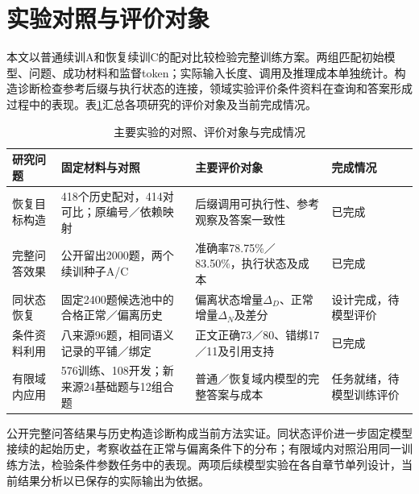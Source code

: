 \section{实验对照与评价对象}

本文以普通续训A和恢复续训C的配对比较检验完整训练方案。两组匹配初始模型、问题、成功材料和监督token；实际输入长度、调用及推理成本单独统计。构造诊断检查参考后缀与执行状态的连接，领域实验评价条件资料在查询和答案形成过程中的表现。表\ref{tab:experiment-matrix}汇总各项研究的评价对象及当前完成情况。

\begin{table}[htbp]
\centering\footnotesize
\caption{主要实验的对照、评价对象与完成情况}
\label{tab:experiment-matrix}
\begin{tabular}{p{2.0cm}p{3.7cm}p{4.5cm}p{2.0cm}}
\toprule
研究问题 & 固定材料与对照 & 主要评价对象 & 完成情况 \\
\midrule
恢复目标构造 & 418个历史配对，414对可比；原编号／依赖映射 & 后缀调用可执行性、参考观察及答案一致性 & 已完成 \\
完整问答效果 & 公开留出2000题，两个续训种子A/C & 准确率78.75\%／83.50\%，执行状态及成本 & 已完成 \\
同状态恢复 & 固定2400题候选池中的合格正常／偏离历史 & 偏离状态增量$\Delta_D$、正常增量$\Delta_N$及差分 & 设计完成，待模型评价 \\
条件资料利用 & 八来源96题，相同语义记录的平铺／绑定 & 正文正确73／80、错绑17／11及引用支持 & 已完成 \\
有限域内应用 & 576训练、108开发；新来源24基础题与12组合题 & 普通／恢复域内模型的完整答案与成本 & 任务就绪，待模型训练评价 \\
\bottomrule
\end{tabular}
\end{table}

公开完整问答结果与历史构造诊断构成当前方法实证。同状态评价进一步固定模型接续的起始历史，考察收益在正常与偏离条件下的分布；有限域内对照沿用同一训练方法，检验条件参数任务中的表现。两项后续模型实验在各自章节单列设计，当前结果分析以已保存的实际输出为依据。
